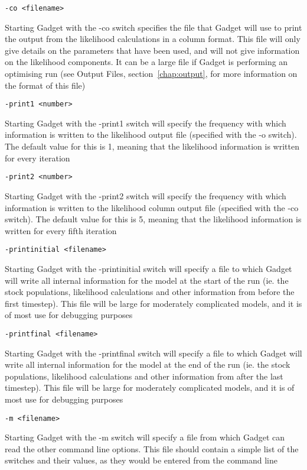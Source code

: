 \documentclass [a4paper, 10pt]{book}
\begin{document}
\begin{verbatim}
-co <filename>
\end{verbatim}
Starting Gadget with the -co switch specifies the file that Gadget will use to print the output from the likelihood calculations in a column format.  This file will only give details on the parameters that have been used, and will not give information on the likelihood components.  It can be a large file if Gadget is performing an optimising run (see Output Files, section~\ref{chap:output}, for more information on the format of this file)

\begin{verbatim}
-print1 <number>
\end{verbatim}
Starting Gadget with the -print1 switch will specify the frequency with which information is written to the likelihood output file (specified with the -o switch).  The default value for this is 1, meaning that the likelihood information is written for every iteration

\begin{verbatim}
-print2 <number>
\end{verbatim}
Starting Gadget with the -print2 switch will specify the frequency with which information is written to the likelihood column output file (specified with the -co switch).  The default value for this is 5, meaning that the likelihood information is written for every fifth iteration

\begin{verbatim}
-printinitial <filename>
\end{verbatim}
Starting Gadget with the -printinitial switch will specify a file to which Gadget will write all internal information for the model at the start of the run (ie. the stock populations, likelihood calculations and other information from before the first timestep).  This file will be large for moderately complicated models, and it is of most use for debugging purposes

\begin{verbatim}
-printfinal <filename>
\end{verbatim}
Starting Gadget with the -printfinal switch will specify a file to which Gadget will write all internal information for the model at the end of the run (ie. the stock populations, likelihood calculations and other information from after the last timestep).  This file will be large for moderately complicated models, and it is of most use for debugging purposes

\begin{verbatim}
-m <filename>
\end{verbatim}
Starting Gadget with the -m switch will specify a file from which Gadget can read the other command line options.  This file should contain a simple list of the switches and their values, as they would be entered from the command line
\end{document}
